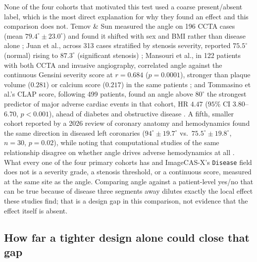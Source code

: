 None of the four cohorts that motivated this test used a coarse present/absent label, which is the
most direct explanation for why they found an effect and this comparison does not. Temov \& Sun
measured the angle on 196 CCTA cases (mean $79.4^\circ \pm 23.0^\circ$) and found it shifted with
sex and BMI rather than disease alone \cite{temov2016bifurcation}; Juan et al., across 313 cases
stratified by stenosis severity, reported $75.5^\circ$ (normal) rising to $87.3^\circ$ (significant
stenosis) \cite{juan2017bifurcation}; Mansouri et al., in 122 patients with both CCTA and invasive
angiography, correlated angle against the continuous Gensini severity score at $r = 0.684$
($p = 0.0001$), stronger than plaque volume ($0.281$) or calcium score ($0.217$) in the same
patients \cite{mansouri2024bifurcation}; and Tommasino et al.'s CLAP score, following 499 patients,
found an angle above $80^\circ$ the strongest predictor of major adverse cardiac events in that
cohort, HR $4.47$ ($95\%$ CI $3.80$--$6.70$, $p<0.001$), ahead of diabetes and obstructive disease
\cite{tommasino2024clap}. A fifth, smaller cohort reported by a 2026 review of coronary anatomy and
hemodynamics found the same direction in diseased left coronaries ($94^\circ \pm 19.7^\circ$ vs.\
$75.5^\circ \pm 19.8^\circ$, $n=30$, $p=0.02$), while noting that computational studies of the same
relationship disagree on whether angle drives adverse hemodynamics at all \cite{shen2026geometry}.
What every one of the four primary cohorts has and ImageCAS-X's \texttt{Disease} field does not is a
severity grade, a stenosis threshold, or a continuous score, measured at the same site as the angle.
Comparing angle against a patient-level yes/no that can be true because of disease three segments
away dilutes exactly the local effect these studies find; that is a design gap in this comparison,
not evidence that the effect itself is absent.

\subsection*{How far a tighter design alone could close that gap}

